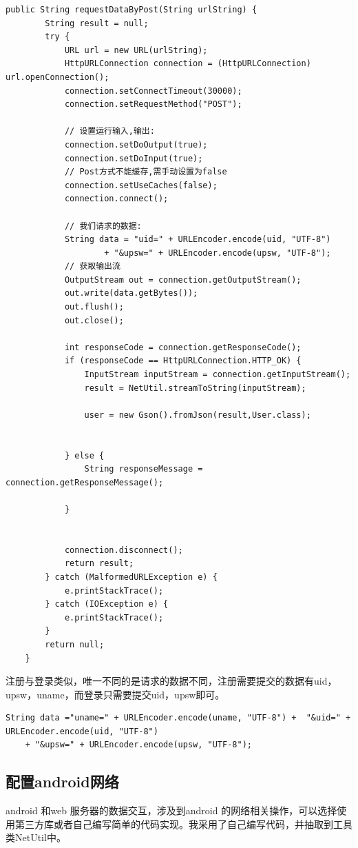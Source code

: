 \documentclass[UTF8,12pt]{article}
\begin{document}
\begin{lstlisting}[frame=shadowbox]
    public String requestDataByPost(String urlString) {
        String result = null;
        try {
            URL url = new URL(urlString);
            HttpURLConnection connection = (HttpURLConnection) url.openConnection();
            connection.setConnectTimeout(30000);
            connection.setRequestMethod("POST");

            // 设置运行输入,输出:
            connection.setDoOutput(true);
            connection.setDoInput(true);
            // Post方式不能缓存,需手动设置为false
            connection.setUseCaches(false);
            connection.connect();

            // 我们请求的数据:
            String data = "uid=" + URLEncoder.encode(uid, "UTF-8")
                    + "&upsw=" + URLEncoder.encode(upsw, "UTF-8");
            // 获取输出流
            OutputStream out = connection.getOutputStream();
            out.write(data.getBytes());
            out.flush();
            out.close();

            int responseCode = connection.getResponseCode();
            if (responseCode == HttpURLConnection.HTTP_OK) {
                InputStream inputStream = connection.getInputStream();
                result = NetUtil.streamToString(inputStream);

                user = new Gson().fromJson(result,User.class);


            } else {
                String responseMessage = connection.getResponseMessage();

            }


            connection.disconnect();
            return result;
        } catch (MalformedURLException e) {
            e.printStackTrace();
        } catch (IOException e) {
            e.printStackTrace();
        }
        return null;
    }
\end{lstlisting}

注册与登录类似，唯一不同的是请求的数据不同，注册需要提交的数据有uid，upsw，uname，而登录只需要提交uid，upsw即可。

\begin{lstlisting}[frame=shadowbox]
    String data ="uname=" + URLEncoder.encode(uname, "UTF-8") +  "&uid=" + URLEncoder.encode(uid, "UTF-8")
    + "&upsw=" + URLEncoder.encode(upsw, "UTF-8");
\end{lstlisting}

\subsection{配置android网络}
android 和web 服务器的数据交互，涉及到android 的网络相关操作，可以选择使用第三方库或者自己编写简单的代码实现。我采用了自己编写代码，并抽取到工具类NetUtil中。
\end{document}
